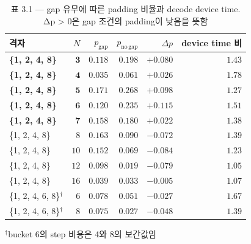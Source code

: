 \begin{table}[!t]
\centering
\caption{표 3.1 — gap 유무에 따른 padding 비율과 decode device time. Δp > 0은 gap 조건의 padding이 낮음을 뜻함}
\label{tab:padvsdevice}
\begin{tabular}{lrrrrr}
\toprule
격자 & $N$ & $p_{\mathrm{gap}}$ & $p_{\mathrm{no\,gap}}$ & $\Delta p$ & device time 비 \\
\midrule
\textbf{\{1, 2, 4, 8\}} & $\mathbf{3}$ & $\mathbf{0.118}$ & $\mathbf{0.198}$ & $\mathbf{+0.080}$ & $\mathbf{1.43}$ \\
\textbf{\{1, 2, 4, 8\}} & $\mathbf{4}$ & $\mathbf{0.035}$ & $\mathbf{0.061}$ & $\mathbf{+0.026}$ & $\mathbf{1.78}$ \\
\textbf{\{1, 2, 4, 8\}} & $\mathbf{5}$ & $\mathbf{0.171}$ & $\mathbf{0.268}$ & $\mathbf{+0.098}$ & $\mathbf{1.27}$ \\
\textbf{\{1, 2, 4, 8\}} & $\mathbf{6}$ & $\mathbf{0.120}$ & $\mathbf{0.235}$ & $\mathbf{+0.115}$ & $\mathbf{1.51}$ \\
\textbf{\{1, 2, 4, 8\}} & $\mathbf{7}$ & $\mathbf{0.158}$ & $\mathbf{0.180}$ & $\mathbf{+0.022}$ & $\mathbf{1.38}$ \\
\{1, 2, 4, 8\} & $8$ & $0.163$ & $0.090$ & $-0.072$ & $1.39$ \\
\{1, 2, 4, 8\} & $10$ & $0.152$ & $0.069$ & $-0.084$ & $1.23$ \\
\{1, 2, 4, 8\} & $12$ & $0.098$ & $0.019$ & $-0.079$ & $1.05$ \\
\{1, 2, 4, 8\} & $16$ & $0.039$ & $0.033$ & $-0.005$ & $1.07$ \\
\midrule
\{1, 2, 4, 6, 8\}$^{\dagger}$ & $6$ & $0.078$ & $0.051$ & $-0.027$ & $1.67$ \\
\{1, 2, 4, 6, 8\}$^{\dagger}$ & $8$ & $0.075$ & $0.027$ & $-0.048$ & $1.39$ \\
\bottomrule
\end{tabular}

\vspace{2pt}
{\footnotesize $^{\dagger}$bucket 6의 step 비용은 4와 8의 보간값임}
\end{table}
